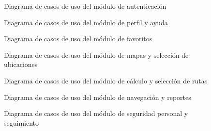 \begin{figure}[htbp]
    \centering
    
    \caption{Diagrama de casos de uso del módulo de autenticación}
    \label{fig:casouso2}
\end{figure}

\begin{figure}[htbp]
    \centering
    
    \caption{Diagrama de casos de uso del módulo de perfil y ayuda}
    \label{fig:casouso3}
\end{figure}

\begin{figure}[htbp]
    \centering
    
    \caption{Diagrama de casos de uso del módulo de favoritos}
    \label{fig:casouso4}
\end{figure}

\begin{figure}[htbp]
    \centering
    
    \caption{Diagrama de casos de uso del módulo de mapas y selección de ubicaciones}
    \label{fig:casouso5}
\end{figure}

\begin{figure}[htbp]
    \centering
    
    \caption{Diagrama de casos de uso del módulo de cálculo y selección de rutas}
    \label{fig:casouso6}
\end{figure}

\begin{figure}[htbp]
    \centering
    
    \caption{Diagrama de casos de uso del módulo de navegación y reportes}
    \label{fig:casouso7}
\end{figure}

\begin{figure}[htbp]
    \centering
    
    \caption{Diagrama de casos de uso del módulo de seguridad personal y seguimiento}
    \label{fig:casouso8}
\end{figure}
